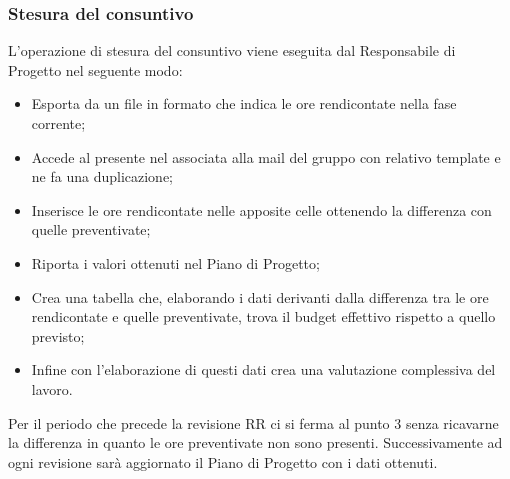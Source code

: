 \newpage

\subsubsection{Stesura del consuntivo}
L'operazione di stesura del consuntivo viene eseguita dal Responsabile di Progetto nel seguente modo:
\begin{itemize}
    \item Esporta da  un file in formato  che indica le ore rendicontate nella fase corrente;
    \item Accede al  presente nel  associata alla mail del gruppo con relativo template e ne fa una duplicazione;
    \item Inserisce le ore rendicontate nelle apposite celle ottenendo la differenza con quelle preventivate;
    \item Riporta i valori ottenuti nel Piano di Progetto;
    \item Crea una tabella che, elaborando i dati derivanti dalla differenza tra le ore rendicontate e quelle preventivate, trova il budget effettivo rispetto a quello previsto;
    \item Infine con l'elaborazione di questi dati crea una valutazione complessiva del lavoro.
\end{itemize}
Per il periodo che precede la revisione RR ci si ferma al punto 3 senza ricavarne la differenza in quanto le ore preventivate non sono presenti. Successivamente ad ogni revisione sarà aggiornato il Piano di Progetto con i dati ottenuti.

